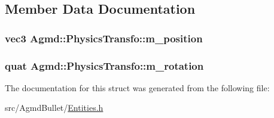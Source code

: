 \subsection{Member Data Documentation}
\hypertarget{struct_agmd_1_1_physics_transfo_adb3dfad5a3709a190b4e49db6ffcb5ba}{
\subsubsection[{m\+\_\+position}]{\setlength{\rightskip}{0pt plus 5cm}vec3 Agmd\+::\+Physics\+Transfo\+::m\+\_\+position}}\label{struct_agmd_1_1_physics_transfo_adb3dfad5a3709a190b4e49db6ffcb5ba}
\hypertarget{struct_agmd_1_1_physics_transfo_aa8c7fed6c1343648b203db5567d8848c}{
\subsubsection[{m\+\_\+rotation}]{\setlength{\rightskip}{0pt plus 5cm}quat Agmd\+::\+Physics\+Transfo\+::m\+\_\+rotation}}\label{struct_agmd_1_1_physics_transfo_aa8c7fed6c1343648b203db5567d8848c}


The documentation for this struct was generated from the following file\+:\begin{DoxyCompactItemize}
\item 
src/\+Agmd\+Bullet/\hyperlink{_agmd_bullet_2_entities_8h}{Entities.\+h}\end{DoxyCompactItemize}
